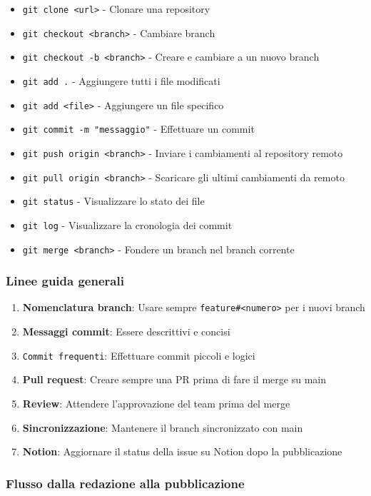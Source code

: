 \begin{itemize}
  \item \texttt{git clone <url>} - Clonare una repository
  \item \texttt{git checkout <branch>} - Cambiare branch
  \item \texttt{git checkout -b <branch>} - Creare e cambiare a un nuovo branch
  \item \texttt{git add .} - Aggiungere tutti i file modificati
  \item \texttt{git add <file>} - Aggiungere un file specifico
  \item \texttt{git commit -m "messaggio"} - Effettuare un commit
  \item \texttt{git push origin <branch>} - Inviare i cambiamenti al repository remoto
  \item \texttt{git pull origin <branch>} - Scaricare gli ultimi cambiamenti da remoto
  \item \texttt{git status} - Visualizzare lo stato dei file
  \item \texttt{git log} - Visualizzare la cronologia dei commit
  \item \texttt{git merge <branch>} - Fondere un branch nel branch corrente
\end{itemize}

\subsubsection{Linee guida generali}

\begin{enumerate}
  \item \textbf{Nomenclatura branch}: Usare sempre \texttt{feature\#<numero>} per i nuovi branch
  \item \textbf{Messaggi commit}: Essere descrittivi e concisi
  \item \texttt{Commit frequenti}: Effettuare commit piccoli e logici
  \item \textbf{Pull request}: Creare sempre una PR prima di fare il merge su main
  \item \textbf{Review}: Attendere l'approvazione del team prima del merge
  \item \textbf{Sincronizzazione}: Mantenere il branch sincronizzato con main
  \item \textbf{Notion}: Aggiornare il status della issue su Notion dopo la pubblicazione
\end{enumerate}

\subsubsection{Flusso dalla redazione alla pubblicazione}


